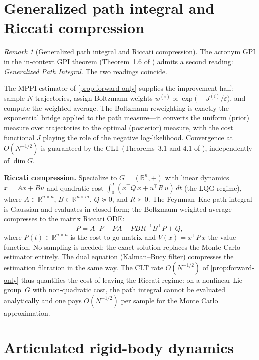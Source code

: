 \documentclass[12pt]{amsart}
\theoremstyle{definition}
\theoremstyle{remark}
\newtheorem*{remark}{Remark}
\newcommand{\R}{\mathbb{R}}
\begin{document}
\section{Generalized path integral and Riccati compression}\label{sec:riccati}

\begin{remark}[Generalized path integral and Riccati compression]
The acronym GPI in the in-context GPI theorem (Theorem~1.6 of \cite{OCT}) admits a second reading:
\emph{Generalized Path Integral}.
The two readings coincide.

The MPPI estimator of \cref{prop:forward-only} supplies the
improvement half: sample $N$ trajectories, assign Boltzmann weights
$w^{(i)} \propto \exp\!\bigl(-J^{(i)}/\varepsilon\bigr)$, and compute
the weighted average.
The Boltzmann reweighting is exactly the exponential bridge applied to
the path measure---it converts the uniform (prior) measure over
trajectories to the optimal (posterior) measure, with the cost
functional $J$ playing the role of the negative log-likelihood.
Convergence at $O(N^{-1/2})$ is guaranteed by the CLT
(Theorems~3.1 and 4.1 of \cite{OCT}), independently of $\dim G$.

\medskip\noindent\textbf{Riccati compression.}
Specialize to $G = (\R^n, +)$ with linear dynamics
$\dot x = Ax + Bu$ and quadratic cost
$\int_0^T (x^\top Q\,x + u^\top R\,u)\,dt$
(the LQG regime),
where $A \in \R^{n \times n}$, $B \in \R^{n \times m}$,
$Q \succeq 0$, and $R \succ 0$.
The Feynman--Kac path integral is Gaussian and evaluates in closed
form; the Boltzmann-weighted average compresses to the matrix Riccati
ODE:
\[
\dot P = A^\top\! P + PA - PBR^{-1}B^\top\! P + Q,
\]
where $P(t) \in \R^{n \times n}$ is the cost-to-go matrix and
$V(x) = x^\top P\, x$ the value function.
No sampling is needed: the exact solution replaces the Monte Carlo
estimator entirely.
The dual equation (Kalman--Bucy filter) compresses the estimation
filtration in the same way.
The CLT rate $O(N^{-1/2})$ of \cref{prop:forward-only} thus quantifies
the cost of leaving the Riccati regime: on a nonlinear Lie group~$G$
with non-quadratic cost, the path integral cannot be evaluated
analytically and one pays $O(N^{-1/2})$ per sample for the Monte Carlo
approximation.
\end{remark}

\section{Articulated rigid-body dynamics}\label{sec:articulated}
\end{document}
